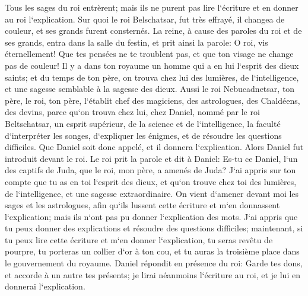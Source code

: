 \verse Tous les sages du roi entrèrent; mais ils ne purent pas lire l`écriture et en donner au roi l`explication. 
\verse Sur quoi le roi Belschatsar, fut très effrayé, il changea de couleur, et ses grands furent consternés. 
\verse La reine, à cause des paroles du roi et de ses grands, entra dans la salle du festin, et prit ainsi la parole: O roi, vis éternellement! Que tes pensées ne te troublent pas, et que ton visage ne change pas de couleur! 
\verse Il y a dans ton royaume un homme qui a en lui l`esprit des dieux saints; et du temps de ton père, on trouva chez lui des lumières, de l`intelligence, et une sagesse semblable à la sagesse des dieux. Aussi le roi Nebucadnetsar, ton père, le roi, ton père, l`établit chef des magiciens, des astrologues, des Chaldéens, des devins, 
\verse parce qu`on trouva chez lui, chez Daniel, nommé par le roi Beltschatsar, un esprit supérieur, de la science et de l`intelligence, la faculté d`interpréter les songes, d`expliquer les énigmes, et de résoudre les questions difficiles. Que Daniel soit donc appelé, et il donnera l`explication. 
\verse Alors Daniel fut introduit devant le roi. Le roi prit la parole et dit à Daniel: Es-tu ce Daniel, l`un des captifs de Juda, que le roi, mon père, a amenés de Juda? 
\verse J`ai appris sur ton compte que tu as en toi l`esprit des dieux, et qu`on trouve chez toi des lumières, de l`intelligence, et une sagesse extraordinaire. 
\verse On vient d`amener devant moi les sages et les astrologues, afin qu`ils lussent cette écriture et m`en donnassent l`explication; mais ils n`ont pas pu donner l`explication des mots. 
\verse J`ai appris que tu peux donner des explications et résoudre des questions difficiles; maintenant, si tu peux lire cette écriture et m`en donner l`explication, tu seras revêtu de pourpre, tu porteras un collier d`or à ton cou, et tu auras la troisième place dans le gouvernement du royaume. 
\verse Daniel répondit en présence du roi: Garde tes dons, et accorde à un autre tes présents; je lirai néanmoins l`écriture au roi, et je lui en donnerai l`explication. 
